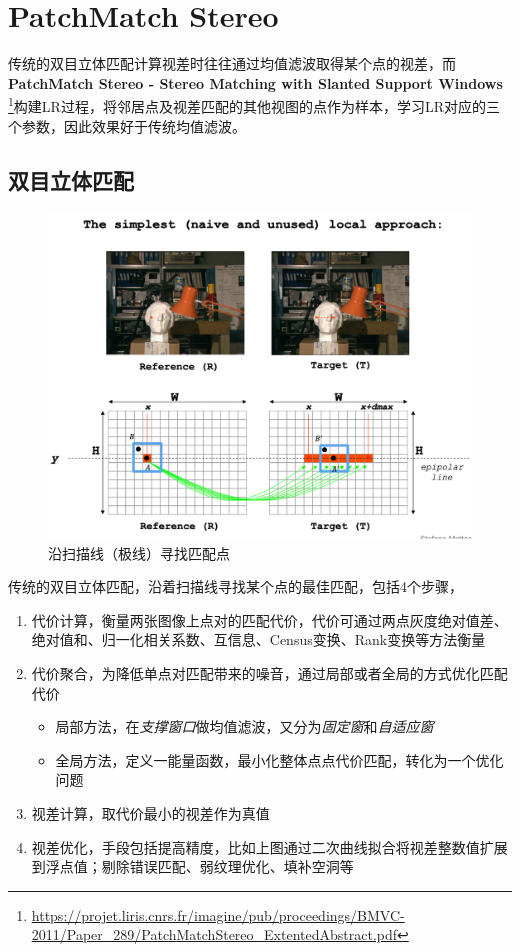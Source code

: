 \section{PatchMatch Stereo}

传统的双目立体匹配计算视差时往往通过均值滤波取得某个点的视差，而
\textbf{PatchMatch Stereo - Stereo Matching with Slanted Support Windows}\protect
\footnote{\url{https://projet.liris.cnrs.fr/imagine/pub/proceedings/BMVC-2011/Paper_289/PatchMatchStereo_ExtentedAbstract.pdf}}构建LR过程，将邻居点及视差匹配的其他视图的点作为样本，学习LR对应的三个参数，因此效果好于传统均值滤波。

\subsection{双目立体匹配}

\begin{figure}[H]
	\begin{center}
		\includegraphics[width=\textwidth]{../images/disparty_constrain.png}
	\end{center}
	\caption{沿扫描线（极线）寻找匹配点}
\end{figure}

传统的双目立体匹配，沿着扫描线寻找某个点的最佳匹配，包括4个步骤，
\begin{enumerate}
	\item 代价计算，衡量两张图像上点对的匹配代价，代价可通过两点灰度绝对值差、绝对值和、归一化相关系数、互信息、Census变换、Rank变换等方法衡量
	\item 代价聚合，为降低单点对匹配带来的噪音，通过局部或者全局的方式优化匹配代价
		\begin{itemize}
			\item 局部方法，在\textit{支撑窗口}做均值滤波，又分为\textit{固定窗}和\textit{自适应窗}
			\item 全局方法，定义一能量函数，最小化整体点点代价匹配，转化为一个优化问题
		\end{itemize}
	\item 视差计算，取代价最小的视差作为真值
	\item 视差优化，手段包括提高精度，比如上图通过二次曲线拟合将视差整数值扩展到浮点值；剔除错误匹配、弱纹理优化、填补空洞等
\end{enumerate}

